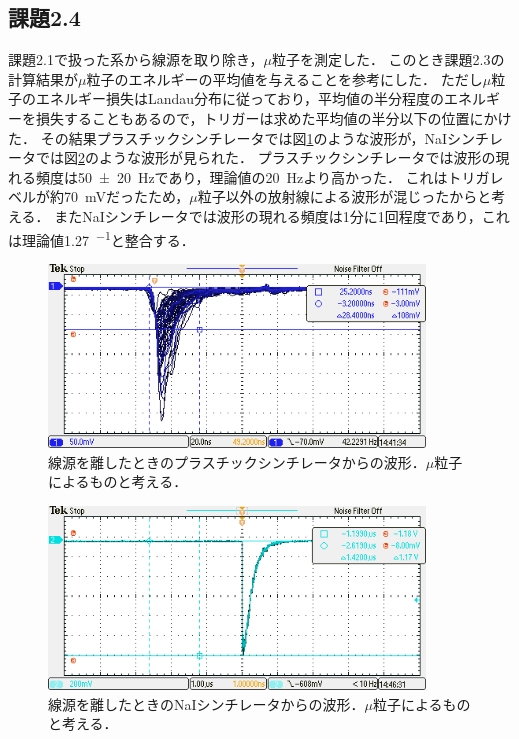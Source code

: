 \documentclass[a4paper,11pt]{jsarticle}
\begin{document}
\subsection{課題2.4}
課題2.1で扱った系から線源を取り除き，$\mu$粒子を測定した．
このとき課題2.3の計算結果が$\mu$粒子のエネルギーの平均値を与えることを参考にした．
ただし$\mu$粒子のエネルギー損失はLandau分布に従っており，平均値の半分程度のエネルギーを損失することもあるので，トリガーは求めた平均値の半分以下の位置にかけた．
その結果プラスチックシンチレータでは図\ref{fig:mu_pla}のような波形が，NaIシンチレータでは図\ref{fig:mu_nai}のような波形が見られた．
プラスチックシンチレータでは波形の現れる頻度は\SI[separate-uncertainty]{50\pm 20}{Hz}であり，理論値の\SI{20}{Hz}より高かった．
これはトリガレベルが約\SI{70}{\mV}だったため，$\mu$粒子以外の放射線による波形が混じったからと考える．
またNaIシンチレータでは波形の現れる頻度は1分に1回程度であり，これは理論値\SI{1.27}{\min^{-1}}と整合する．

\begin{figure}[htbp]
  \centering
  \includegraphics[width=10cm]{TEK00746.png}
  \caption{線源を離したときのプラスチックシンチレータからの波形．$\mu$粒子によるものと考える．}
  \label{fig:mu_pla}
\end{figure}


\begin{figure}[htbp]
  \centering
  \includegraphics[width=10cm]{TEK00747.png}
  \caption{線源を離したときのNaIシンチレータからの波形．$\mu$粒子によるものと考える．}
  \label{fig:mu_nai}
\end{figure}
\end{document}
